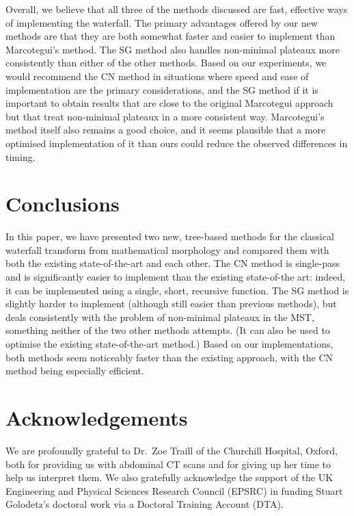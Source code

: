 \documentclass[review,a4paper]{elsarticle}
\begin{document}
Overall, we believe that all three of the methods discussed are fast, effective ways of implementing the waterfall. The primary advantages offered by our new methods are that they are both somewhat faster and easier to implement than Marcotegui's method. The SG method also handles non-minimal plateaux more consistently than either of the other methods. Based on our experiments, we would recommend the CN method in situations where speed and ease of implementation are the primary considerations, and the SG method if it is important to obtain results that are close to the original Marcotegui approach but that treat non-minimal plateaux in a more consistent way. Marcotegui's method itself also remains a good choice, and it seems plausible that a more optimised implementation of it than ours could reduce the observed differences in timing.

\section{Conclusions}
\label{sec:conclusions}

In this paper, we have presented two new, tree-based methods for the classical waterfall transform from mathematical morphology and compared them with both the existing state-of-the-art and each other. The CN method is single-pass and is significantly easier to implement than the existing state-of-the art: indeed, it can be implemented using a single, short, recursive function. The SG method is slightly harder to implement (although still easier than previous methods), but deals consistently with the problem of non-minimal plateaux in the MST, something neither of the two other methods attempts. (It can also be used to optimise the existing state-of-the-art method.) Based on our implementations, both methods seem noticeably faster than the existing approach, with the CN method being especially efficient.

\section{Acknowledgements}
\label{sec:acknowledgements}

We are profoundly grateful to Dr.\ Zoe Traill of the Churchill Hospital, Oxford, both for providing us with abdominal CT scans and for giving up her time to help us interpret them. We also gratefully acknowledge the support of the UK Engineering and Physical Sciences Research Council (EPSRC) in funding Stuart Golodetz's doctoral work via a Doctoral Training Account (DTA).



\end{document}
